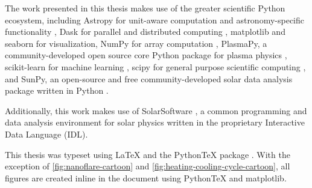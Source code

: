 The work presented in this thesis makes use of the greater scientific Python ecosystem, including Astropy for unit-aware computation and astronomy-specific functionality \citep{the_astropy_collaboration_astropy_2018}, Dask for parallel and distributed computing \citep{rocklin_dask_2015}, matplotlib \citep{hunter_matplotlib_2007} and seaborn \citep{waskom_seaborn_2018} for visualization, NumPy for array computation \citep{oliphant_guide_2006}, PlasmaPy, a community-developed open source core Python package for plasma physics \citep{plasmapy_community_2018_1238132}, scikit-learn for machine learning \citep{pedregosa_scikit-learn_2011}, scipy for general purpose scientific computing \citep[e.g. interpolation, curve fitting, special functions][]{jones_scipy_2001}, and SunPy, an open-source and free community-developed solar data analysis package written in Python \citep{sunpy_community_sunpypython_2015}.

Additionally, this work makes use of SolarSoftware \citep[SSW,][]{freeland_data_1998}, a common programming and data analysis environment for solar physics written in the proprietary Interactive Data Language (IDL).

This thesis was typeset using \LaTeX{} and the Python\TeX{} package \citep{poore_pythontex_2015}. With the exception of \autoref{fig:nanoflare-cartoon} and \autoref{fig:heating-cooling-cycle-cartoon}, all figures are created inline in the document using Python\TeX{} and matplotlib.

